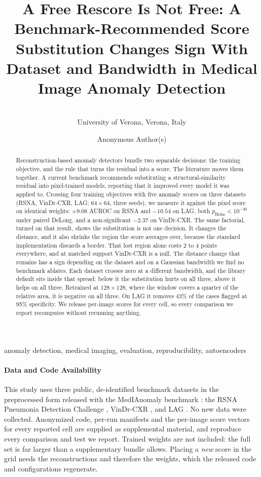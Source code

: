 \documentclass[pmlr,twocolumn,10pt]{jmlr} %
\title[A Free Rescore Is Not Free]{A Free Rescore Is Not Free: A
  Benchmark-Recommended Score Substitution Changes Sign With Dataset and
  Bandwidth in Medical Image Anomaly Detection}
\author{%
    \Name{Tesfay Hagos Weldegebriel} \Email{tesfayhagos1421@studenti.univr.it}\\
    \addr University of Verona, Verona, Italy
  }
\author{Anonymous Author(s)}
\newif\iffinal
\begin{document}
\iffinal\else\linenumbers\fi
\maketitle
\begin{abstract}
Reconstruction-based anomaly detectors bundle two separable decisions: the training
objective, and the rule that turns the residual into a score. The literature
moves them together. A current benchmark recommends substituting a structural-similarity
residual into pixel-trained models, reporting that it improved every model it was applied
to. Crossing four training objectives with five anomaly scores on three datasets (RSNA,
VinDr-CXR, LAG; $64\times64$, three seeds), we measure it against the pixel score on
identical weights: $+9.08$ AUROC on RSNA and $-10.54$ on LAG, both
$p_{\mathrm{Holm}}<10^{-30}$ under paired DeLong, and a non-significant $-2.37$ on
VinDr-CXR. The same factorial, turned on that result, shows the substitution is not one
decision. It changes the distance, and it also shrinks the region the score averages over,
because the standard implementation discards a border. That lost region alone costs 2 to 4
points everywhere, and at matched support VinDr-CXR is a null. The distance change that
remains has a sign depending on the dataset and on a Gaussian bandwidth we find no
benchmark ablates. Each dataset crosses zero at a different bandwidth, and the library
default sits inside that spread: below it the substitution hurts on all three, above it
helps on all three. Retrained at $128\times128$, where the window covers a quarter of the
relative area, it is negative on all three. On LAG it removes 43\% of the cases flagged
at 95\% specificity. We release per-image scores for every cell, so every comparison we report
recomputes without rerunning anything.
\end{abstract}
\begin{keywords}
anomaly detection, medical imaging, evaluation, reproducibility, autoencoders
\end{keywords}

\paragraph*{Data and Code Availability}
This study uses three public, de-identified benchmark datasets in the preprocessed form
released with the MedIAnomaly benchmark \citep{cai2025medianomaly}: the RSNA Pneumonia
Detection Challenge \citep{shih2019rsna}, VinDr-CXR \citep{nguyen2022vindr}, and LAG
\citep{li2019lag}. No new data were collected. Anonymized code, per-run manifests and the per-image score vectors for
every reported cell are supplied as supplemental material, and reproduce every comparison
and test we report. Trained weights are not included: the full set is far larger than a
supplementary bundle allows. Placing a \emph{new} score in the grid needs the
reconstructions and therefore the weights, which the released code and configurations
regenerate.
\end{document}
